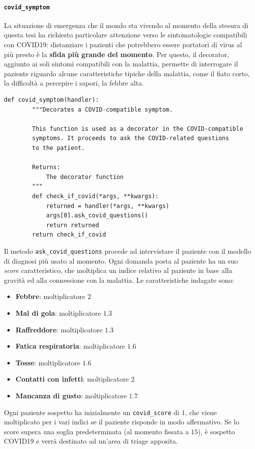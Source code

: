 \paragraph{\texttt{covid\_symptom}} La situazione di emergenza che il mondo sta vivendo al momento della stesura di questa tesi ha richiesto particolare attenzione verso le sintomatologie compatibili con COVID19: distanziare i pazienti che potrebbero essere portatori di virus al più presto è la \textbf{sfida più grande del momento}. Per questo, il decorator, aggiunto ai soli sintomi compatibili con la malattia, permette di interrogare il paziente riguardo alcune caratteristiche tipiche della malattia, come il fiato corto, la difficoltà a percepire i sapori, la febbre alta.
\begin{verbatim}
def covid_symptom(handler):
        """Decorates a COVID-compatible symptom.

        This function is used as a decorator in the COVID-compatible
        symptoms. It proceeds to ask the COVID-related questions
        to the patient.

        Returns:
            The decorator function
        """
        def check_if_covid(*args, **kwargs):
            returned = handler(*args, **kwargs)
            args[0].ask_covid_questions()
            return returned
        return check_if_covid
\end{verbatim}
Il metodo \texttt{ask\_covid\_questions} procede ad intervistare il paziente con il modello di diagnosi più usato al momento. Ogni domanda posta al paziente ha un suo \textit{score} caratteristico, che moltiplica un indice relativo al paziente in base alla gravità ed alla connessione con la malattia. Le caratteristiche indagate sono:
\begin{itemize}
  \item \textbf{Febbre}: moltiplicatore $2$
  \item \textbf{Mal di gola}: moltiplicatore $1.3$
  \item \textbf{Raffreddore}: moltiplicatore $1.3$
  \item \textbf{Fatica respiratoria}: moltiplicatore $1.6$
  \item \textbf{Tosse}: moltiplicatore $1.6$
  \item \textbf{Contatti con infetti}: moltiplicatore $2$
  \item \textbf{Mancanza di gusto}: moltiplicatore $1.7$
\end{itemize}
Ogni paziente sospetto ha inizialmente un \texttt{covid\_score} di $1$, che viene moltiplicato per i vari indici se il paziente risponde in modo affermativo. Se lo score supera una soglia predeterminata (al momento fissata a $15$), è sospetto COVID19 e verrà destinato ad un'area di triage apposita.
